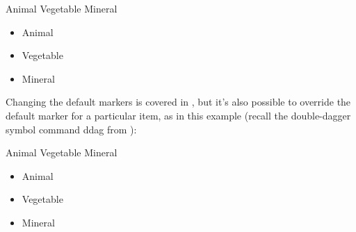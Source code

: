 \begin{code}
\newline
{} Animal\newline
{} Vegetable\newline
{} Mineral\newline
{}
\end{code}
\begin{result}
\begin{itemize}
\item Animal
\item Vegetable
\item Mineral
\end{itemize}
\end{result}


Changing the default markers is covered in , 
but it's also possible to override the default marker for a
particular item, as in this example (recall the double-dagger
symbol command \gls{ddag} from ):
\begin{code}
\newline
{} Animal\newline
{} Vegetable\newline
{} Mineral\newline
{}
\end{code}%
\begin{result}
\begin{itemize}
\item Animal
\item[\ddag] Vegetable
\item Mineral
\end{itemize}
\end{result}

